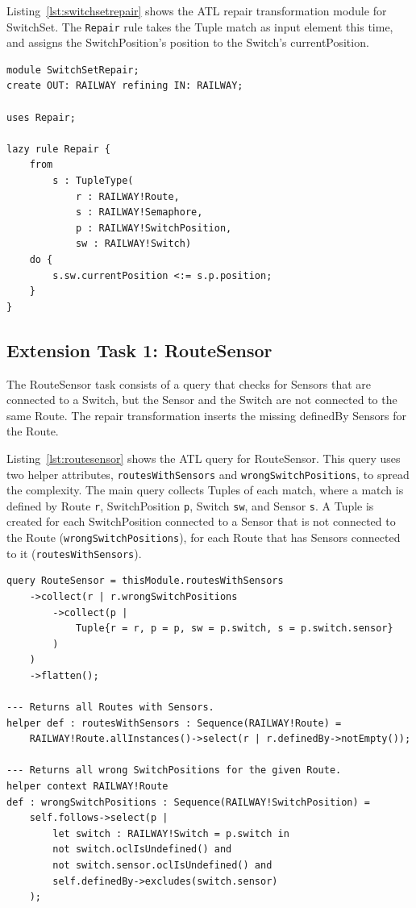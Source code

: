 \documentclass[submission,copyright,creativecommons]{eptcs}
\begin{document}
Listing~\ref{lst:switchsetrepair} shows the ATL repair transformation module for SwitchSet. The \texttt{Repair} rule takes the Tuple match as input element this time, and assigns the SwitchPosition's position to the Switch's currentPosition.

\lstset{language=atl}
\begin{lstlisting}[float=htb, caption={SwitchSet repair transformation module in ATL}, label=lst:switchsetrepair, captionpos=b, frame=tb, belowskip=-10pt]
module SwitchSetRepair;
create OUT: RAILWAY refining IN: RAILWAY;

uses Repair;

lazy rule Repair {
	from
		s : TupleType(
			r : RAILWAY!Route, 
			s : RAILWAY!Semaphore, 
			p : RAILWAY!SwitchPosition, 
			sw : RAILWAY!Switch)
	do {
		s.sw.currentPosition <:= s.p.position;
	}
}
\end{lstlisting}

\subsection{Extension Task 1: RouteSensor}

The RouteSensor task consists of a query that checks for Sensors that are connected to a Switch, but the Sensor and the Switch are not connected to the same Route. The repair transformation inserts the missing definedBy Sensors for the Route. 

Listing~\ref{lst:routesensor} shows the ATL query for RouteSensor. This query uses two helper attributes, \texttt{routes\-With\-Sensors} and \texttt{wrongSwitchPositions}, to spread the complexity. The main query collects Tuples  of each match, where a match is defined by Route \texttt{r}, SwitchPosition \texttt{p}, Switch \texttt{sw}, and Sensor \texttt{s}. A Tuple is created for each SwitchPosition connected to a Sensor that is not connected to the Route (\texttt{wrongSwitchPositions}), for each Route that has Sensors connected to it (\texttt{routesWithSensors}). 

\lstset{language=atl}
\begin{lstlisting}[float=htb, caption={RouteSensor query in ATL}, label=lst:routesensor, captionpos=b, frame=tb, belowskip=-10pt]
query RouteSensor = thisModule.routesWithSensors
	->collect(r | r.wrongSwitchPositions
		->collect(p | 
			Tuple{r = r, p = p, sw = p.switch, s = p.switch.sensor}
		)
	)
	->flatten();

--- Returns all Routes with Sensors.
helper def : routesWithSensors : Sequence(RAILWAY!Route) =
	RAILWAY!Route.allInstances()->select(r | r.definedBy->notEmpty());

--- Returns all wrong SwitchPositions for the given Route.
helper context RAILWAY!Route 
def : wrongSwitchPositions : Sequence(RAILWAY!SwitchPosition) =
	self.follows->select(p | 
		let switch : RAILWAY!Switch = p.switch in
		not switch.oclIsUndefined() and 
		not switch.sensor.oclIsUndefined() and
		self.definedBy->excludes(switch.sensor)
	);
\end{lstlisting}
\end{document}
